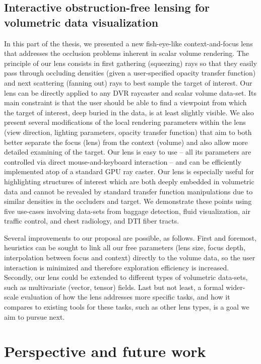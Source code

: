 \subsection{Interactive obstruction-free lensing for volumetric data visualization }
In this part of the thesis, we presented a new fish-eye-like context-and-focus lens that addresses the occlusion problems inherent in scalar volume rendering. The principle of our lens consists in first gathering (squeezing) rays so that they easily pass through occluding densities (given a user-specified opacity transfer function) and next scattering (fanning out) rays to best sample the target of interest. Our lens can be directly applied to any DVR raycaster and scalar volume data-set. Its main constraint is that the user should be able to find a viewpoint from which the target of interest, deep buried in the data, is at least slightly visible. We also present several modifications of the local rendering parameters within the lens (view direction, lighting parameters, opacity transfer function) that aim to both better separate the focus (lens) from the context (volume) and also allow more detailed examining of the target. Our lens is easy to use -- all its parameters are controlled via direct mouse-and-keyboard interaction -- and can be efficiently implemented atop of a standard GPU ray caster. Our lens is especially useful for highlighting structures of interest which are both deeply embedded in volumetric data and cannot be revealed by standard transfer function manipulations due to similar densities in the occluders and target. We demonstrate these points using five use-cases involving data-sets from baggage detection, fluid visualization, air traffic control, and chest radiology, and DTI fiber tracts.

Several improvements to our proposal are possible, as follows. First and foremost, heuristics can be sought to link all our free parameters (lens size, focus depth, interpolation between focus and context) directly to the volume data, so the user interaction is minimized and therefore exploration efficiency is increased. Secondly, our lens could be extended to different types of volumetric data-sets, such as multivariate (vector, tensor) fields. Last but not least, a formal wider-scale evaluation of how the lens addresses more specific tasks, and how it compares to existing tools for these tasks, such as other lens types, is a goal we aim to pursue next.

\section{Perspective and future work}

